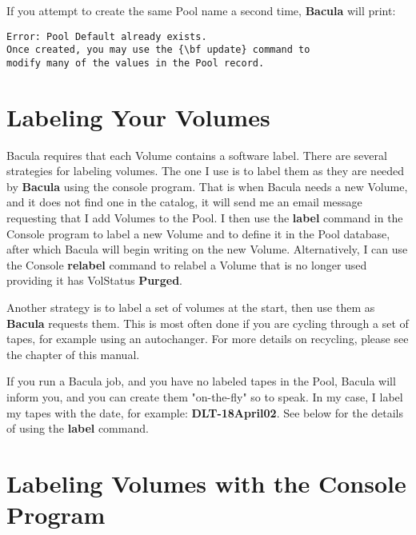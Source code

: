 If you attempt to create the same Pool name a second time, {\bf Bacula} will
print: 

\footnotesize
\begin{verbatim}
Error: Pool Default already exists.
Once created, you may use the {\bf update} command to
modify many of the values in the Pool record.
\end{verbatim}
\normalsize

\label{Labeling}

\section{Labeling Your Volumes}

Bacula requires that each Volume contains a software label. There are several
strategies for labeling volumes. The one I use is to label them as they are
needed by {\bf Bacula} using the console program. That is when Bacula needs a
new Volume, and it does not find one in the catalog, it will send me an email
message requesting that I add Volumes to the Pool. I then use the {\bf label}
command in the Console program to label a new Volume and to define it in the
Pool database, after which Bacula will begin writing on the new Volume.
Alternatively, I can use the Console {\bf relabel} command to relabel a Volume
that is no longer used providing it has VolStatus {\bf Purged}. 

Another strategy is to label a set of volumes at the start, then use them as
{\bf Bacula} requests them. This is most often done if you are cycling through
a set of tapes, for example using an autochanger. For more details on
recycling, please see the 
 chapter of
this manual. 

If you run a Bacula job, and you have no labeled tapes in the Pool, Bacula
will inform you, and you can create them "on-the-fly" so to speak. In my
case, I label my tapes with the date, for example: {\bf DLT-18April02}. See
below for the details of using the {\bf label} command. 

\section{Labeling Volumes with the Console Program}

